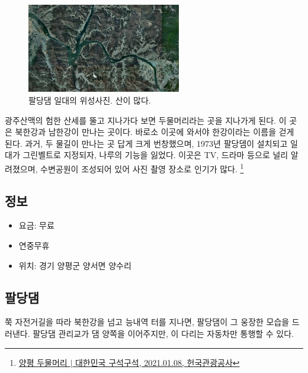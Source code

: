 \begin{figure}
    \centering
    \includegraphics[width=0.6\textwidth]{img/팔당호지도.jpg}
    \caption{팔당댐 일대의 위성사진. 산이 많다.\protect\footnotemark}
    \label{fig:my_label8}
\end{figure}


광주산맥의 험한 산세를 뚤고 지나가다 보면 두물머리라는 곳을 지나가게 된다. 이 곳은 북한강과 남한강이 만나는 곳이다.
바로소 이곳에 와서야 한강이라는 이름을 걷게 된다.
과거, 두 물길이 만나는 곳 답게 크게 번창했으며, 1973년 팔당뎀이 설치되고 일대가 그린벨트로 지정되자,
나루의 기능을 잃었다.
이곳은 TV, 드라마 등으로 널리 알려졌으며,
수변공원이 조성되어 있어 사진 촬영 장소로 인기가 많다.
\footnote{\href{https://terms.naver.com/entry.naver?docId=1997444&cid=42856&categoryId=42856}{양평 두물머리 $|$ 대한민국 구석구석, 2021.01.08, 헌국관광공사}}

\subsection{정보}
\begin{itemize}
    \item 요금: 무료
    \item 연중무휴
    \item 위치: 경기 양평군 양서면 양수리
\end{itemize}


\subsection{팔당댐}
쭉 자전거길을 따라 북한강을 넘고 능내역 터를 지나면, 팔당댐이 그 웅장한 모습을 드러낸다. 
팔당댐 관리교가 댐 양쪽을 이어주지만, 이 다리는 자동차만 통행할 수 있다.


